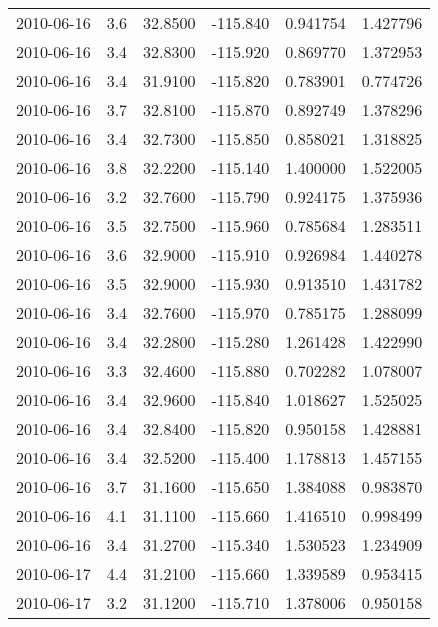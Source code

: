 \begin{tabular}{lrrrrr}
2010-06-16 &       3.6 &  32.8500 &  -115.840 &         0.941754 &         1.427796 \\
2010-06-16 &       3.4 &  32.8300 &  -115.920 &         0.869770 &         1.372953 \\
2010-06-16 &       3.4 &  31.9100 &  -115.820 &         0.783901 &         0.774726 \\
2010-06-16 &       3.7 &  32.8100 &  -115.870 &         0.892749 &         1.378296 \\
2010-06-16 &       3.4 &  32.7300 &  -115.850 &         0.858021 &         1.318825 \\
2010-06-16 &       3.8 &  32.2200 &  -115.140 &         1.400000 &         1.522005 \\
2010-06-16 &       3.2 &  32.7600 &  -115.790 &         0.924175 &         1.375936 \\
2010-06-16 &       3.5 &  32.7500 &  -115.960 &         0.785684 &         1.283511 \\
2010-06-16 &       3.6 &  32.9000 &  -115.910 &         0.926984 &         1.440278 \\
2010-06-16 &       3.5 &  32.9000 &  -115.930 &         0.913510 &         1.431782 \\
2010-06-16 &       3.4 &  32.7600 &  -115.970 &         0.785175 &         1.288099 \\
2010-06-16 &       3.4 &  32.2800 &  -115.280 &         1.261428 &         1.422990 \\
2010-06-16 &       3.3 &  32.4600 &  -115.880 &         0.702282 &         1.078007 \\
2010-06-16 &       3.4 &  32.9600 &  -115.840 &         1.018627 &         1.525025 \\
2010-06-16 &       3.4 &  32.8400 &  -115.820 &         0.950158 &         1.428881 \\
2010-06-16 &       3.4 &  32.5200 &  -115.400 &         1.178813 &         1.457155 \\
2010-06-16 &       3.7 &  31.1600 &  -115.650 &         1.384088 &         0.983870 \\
2010-06-16 &       4.1 &  31.1100 &  -115.660 &         1.416510 &         0.998499 \\
2010-06-16 &       3.4 &  31.2700 &  -115.340 &         1.530523 &         1.234909 \\
2010-06-17 &       4.4 &  31.2100 &  -115.660 &         1.339589 &         0.953415 \\
2010-06-17 &       3.2 &  31.1200 &  -115.710 &         1.378006 &         0.950158 \\

\end{tabular}
